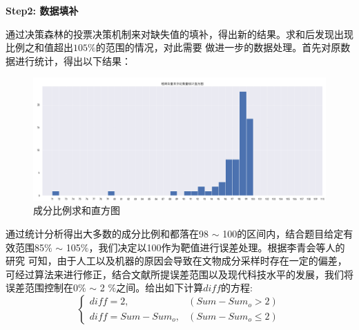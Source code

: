 \documentclass[UTF8]{ctexart}
\begin{document}


            \textbf{Step2: 数据填补}

            通过决策森林的投票决策机制来对缺失值的填补，得出新的结果。求和后发现出现比例之和值超出$105 \% $的范围的情况，对此需要
            做进一步的数据处理。首先对原数据进行统计，得出以下结果：

            \begin{figure}[H]\centering
                \includegraphics[width=1\textwidth,height=0.48\textwidth]{img/成分比例求和直方图.png} %
                \caption{成分比例求和直方图} %
                \label{fig:figure 2} %
            \end{figure}

            通过统计分析得出大多数的成分比例和都落在98 $\sim$ 100的区间内，结合题目给定有效范围85$\%$ $\sim $ 105$\%$，我们决定以100作为靶值进行误差处理。根据李青会等人的研究\cite{ref1} 可知，由于人工以及机器的原因会导致在文物成分采样时存在一定的偏差，可经过算法来进行修正，结合文献所提误差范围以及现代科技水平的发展，我们将误差范围控制在0$\%$ $\sim$ 2 $\%$之间。给出如下计算$diff$的方程:
            \[\left\{\begin{array}{llcl}

                    diff = 2,         & (Sum-Sum_o>2)     \\
                    diff = Sum-Sum_o, & (Sum-Sum_o\leq 2)
                \end{array} \right.\]
\end{document}
